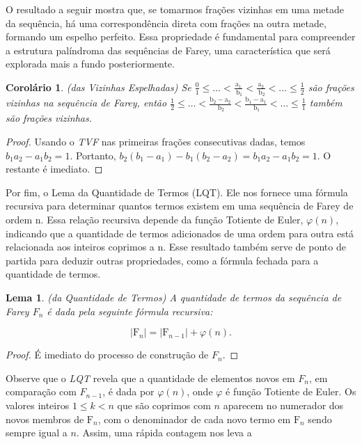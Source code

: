 \documentclass{hipatia}
\newtheorem*{lemma*}{Lema}
\newtheorem*{corollary*}{Corolário} %
\theoremstyle{definition} %
\begin{document}
O resultado a seguir mostra que, se tomarmos frações vizinhas em uma metade da sequência, há uma correspondência direta com frações na outra metade, formando um espelho perfeito. Essa propriedade é fundamental para compreender a estrutura palíndroma das sequências de Farey, uma característica que será explorada mais a fundo posteriormente.

\begin{corollary*} (das Vizinhas Espelhadas)
    Se \(\frac{0}{1} \leq \ldots<\frac{\mathrm{a}_{1}}{\mathrm{~b}_{1}}<\frac{\mathrm{a}_{2}}{\mathrm{~b}_{2}}<\ldots \leq \frac{1}{2}\) são frações vizinhas na sequência de Farey, então \(\frac{1}{2} \leq \ldots<\frac{\mathrm{b}_{2}-\mathrm{a}_{2}}{\mathrm{~b}_{2}}<\frac{\mathrm{b}_{1}-\mathrm{a}_{1}}{\mathrm{~b}_{1}}<\ldots \leq \frac{1}{1}\) também são frações vizinhas.
\end{corollary*}



\begin{proof}
Usando o \textit{TVF} nas primeiras frações consecutivas dadas, temos  
\(b_{1} a_{2} - a_{1} b_{2} = 1\).  
Portanto, \(b_{2}\left(b_{1} - a_{1}\right) - b_{1}\left(b_{2} - a_{2}\right) = b_{1} a_{2} - a_{1} b_{2} = 1\). O restante é imediato.
\end{proof}

Por fim, o Lema da Quantidade de Termos (LQT). Ele nos fornece uma fórmula recursiva para determinar quantos termos existem em uma sequência de Farey de ordem n. Essa relação recursiva depende da função Totiente de Euler, $\varphi(n)$, indicando que a quantidade de termos adicionados de uma ordem para outra está relacionada aos inteiros coprimos a n. Esse resultado também serve de ponto de partida para deduzir outras propriedades, como a fórmula fechada para a quantidade de termos.

\begin{lemma*} (da Quantidade de Termos)
    A quantidade de termos da sequência de Farey \(F_{n}\) é dada pela seguinte fórmula recursiva:

\[
\left|\mathrm{F}_{n}\right|=\left|\mathrm{F}_{n-1}\right|+\varphi(n) .
\]
\end{lemma*}

\begin{proof}
    É imediato do processo de construção de $F_n$.
\end{proof}

Observe que o \textit{LQT} revela que a quantidade de elementos novos em \(F_{n}\), em comparação com \(F_{n-1}\), é dada por \(\varphi(n)\), onde $\varphi$ é função Totiente de Euler. Os valores inteiros \(1 \leq k < n\) que são coprimos com \(n\) aparecem no numerador dos novos membros de \(\mathrm{F}_{n}\), com o denominador de cada novo termo em \(\mathrm{F}_{n}\) sendo sempre igual a \(n\). Assim, uma rápida contagem nos leva a
\end{document}
